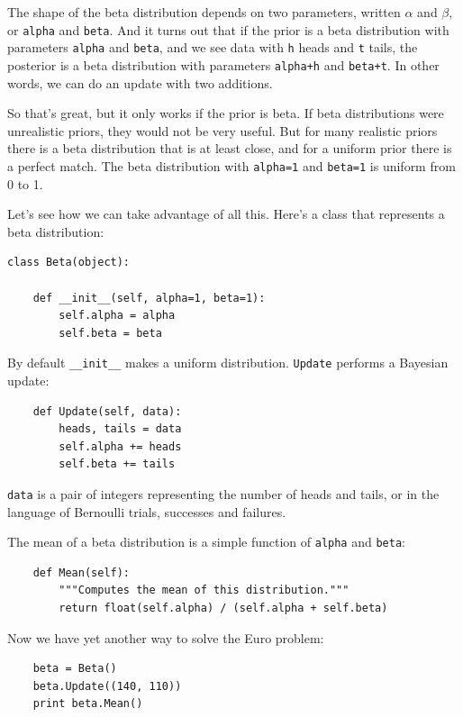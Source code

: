 \documentclass[12pt]{book}
\begin{document}
The shape of the beta distribution depends on two parameters,
written $\alpha$ and $\beta$, or
{\tt alpha} and {\tt beta}.  And it turns out that if
the prior is a beta distribution with parameters {\tt alpha} and {\tt beta},
and we see data with {\tt h} heads and {\tt t} tails, the posterior is a beta
distribution with parameters {\tt alpha+h} and {\tt beta+t}.  In other
words, we can do an update with two additions.

So that's great, but it only works if the prior is beta.
If beta distributions were unrealistic priors, they would not be
very useful.  But for many realistic priors there is a beta
distribution that is at least close, and for a uniform prior
there is a perfect match.  The beta distribution with
{\tt alpha=1} and {\tt beta=1} is uniform from 0 to 1.

Let's see how we can take advantage of all this.  Here's
a class that represents a beta distribution:

\begin{verbatim}
class Beta(object):

    def __init__(self, alpha=1, beta=1):
        self.alpha = alpha
        self.beta = beta
\end{verbatim}

By default \verb"__init__" makes a uniform distribution.
{\tt Update} performs a Bayesian update:

\begin{verbatim}
    def Update(self, data):
        heads, tails = data
        self.alpha += heads
        self.beta += tails
\end{verbatim}

{\tt data} is a pair of integers representing the number of
heads and tails, or in the language of Bernoulli trials, successes
and failures.

The mean of a beta distribution is a simple function of
{\tt alpha} and {\tt beta}:

\begin{verbatim}
    def Mean(self):
        """Computes the mean of this distribution."""
        return float(self.alpha) / (self.alpha + self.beta)
\end{verbatim}

Now we have yet another way to solve the Euro problem:

\begin{verbatim}
    beta = Beta()
    beta.Update((140, 110))
    print beta.Mean()
\end{verbatim}
\end{document}
